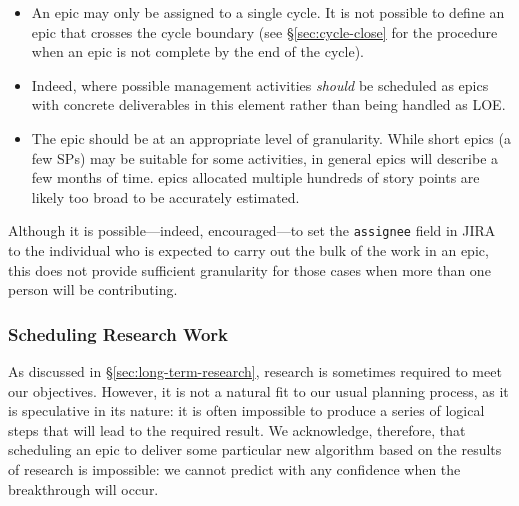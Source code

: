 \begin{itemize}
\begin{itemize}
\item An \gls{epic} may only be assigned to a single \gls{cycle}.
  It is not possible to define an \gls{epic} that crosses the \gls{cycle} boundary (see \S\ref{sec:cycle-close} for the procedure when an \gls{epic} is not complete by the end of the \gls{cycle}).
\item Indeed, where possible management activities \emph{should} be scheduled as \glspl{epic} with concrete deliverables in this \gls{element} rather than being handled as \gls{LOE}.
\item The \gls{epic} should be at an appropriate level of granularity.
  While short \glspl{epic} (a few \glspl{SP}) may be suitable for some activities, in general \glspl{epic} will describe a few months of time.
  \Glspl{epic} allocated multiple hundreds of \gls{story} points are likely too broad to be accurately estimated.
\end{itemize}


Although it is possible---indeed, encouraged---to set the \texttt{assignee} field in \gls{JIRA} to the individual who is expected to carry out the bulk of the work in an \gls{epic}, this does not provide sufficient granularity for those cases when more than one person will be contributing.



\subsubsection{Scheduling Research Work} \label{sec:research}

As discussed in \S\ref{sec:long-term-research}, research is sometimes required
to meet our objectives. However, it is not a natural fit to our usual
planning process, as it is speculative in its nature: it is often
impossible to produce a series of logical steps that will lead to the
required result. We acknowledge, therefore, that scheduling an \gls{epic} to
deliver some particular new \gls{algorithm} based on the results of research
is impossible: we cannot predict with any confidence when the
breakthrough will occur.


\end{itemize}
